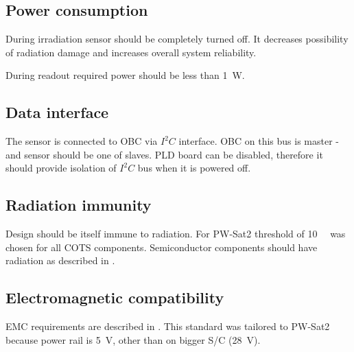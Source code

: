     \subsection{Power consumption}
        During irradiation sensor should be completely turned off. It decreases possibility of radiation damage and increases overall system reliability.

        During readout required power should be less than \SI{1}{W}.

    \subsection{Data interface}
        The sensor is connected to OBC via $I^2C$ interface. OBC on this bus is master - and sensor should be one of slaves. PLD board can be disabled, therefore it should provide isolation of $I^2C$ bus when it is powered off.

    \subsection{Radiation immunity}
        Design should be itself immune to radiation. For PW-Sat2 threshold of \SI{10}{\kilo\rad} was chosen for all COTS components. Semiconductor components should have radiation as described in \cite{ESCIES_TID_test_method}.

    \subsection{Electromagnetic compatibility}
        EMC requirements are described in \cite{ECSS_E_ST_20_07C}. This standard was tailored to PW-Sat2 because power rail is \SI{+5}{\volt}, other than on bigger S/C (\SI{+28}{\volt}).

